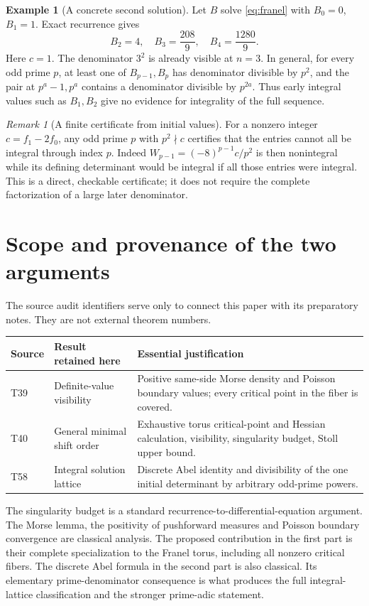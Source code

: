 \documentclass[11pt,a4paper]{article}
\theoremstyle{definition}\newtheorem{definition}[theorem]{Definition}
\newtheorem{example}[theorem]{Example}
\theoremstyle{remark}\newtheorem{remark}[theorem]{Remark}
\begin{document}
\begin{example}[A concrete second solution]
Let $B$ solve \eqref{eq:franel} with $B_0=0$, $B_1=1$. Exact recurrence gives
\[
 B_2=4,\quad B_3=\frac{208}{9},\quad B_4=\frac{1280}{9}.
\]
Here $c=1$. The denominator $3^2$ is already visible at $n=3$. In general,
for every odd prime $p$, at least one of $B_{p-1},B_p$ has denominator divisible
by $p^2$, and the pair at $p^a-1,p^a$ contains a denominator divisible by
$p^{2a}$. Thus early integral values such as $B_1,B_2$ give no evidence for
integrality of the full sequence.
\end{example}

\begin{remark}[A finite certificate from initial values]
For a nonzero integer $c=f_1-2f_0$, any odd prime $p$ with $p^2\nmid c$
certifies that the entries cannot all be integral through index $p$. Indeed
$W_{p-1}=(-8)^{p-1}c/p^2$ is then nonintegral while its defining determinant
would be integral if all those entries were integral. This is a direct,
checkable certificate; it does not require the complete factorization of a
large later denominator.
\end{remark}

\section{Scope and provenance of the two arguments}
The source audit identifiers serve only to connect this paper with its
preparatory notes. They are not external theorem numbers.
\begin{center}
\begin{tabular}{@{}p{}p{}p{}@{}}
\toprule
Source & Result retained here & Essential justification\\
\midrule
T39 & Definite-value visibility & Positive same-side Morse density and
Poisson boundary values; every critical point in the fiber is covered.\\
T40 & General minimal shift order & Exhaustive torus critical-point and
Hessian calculation, visibility, singularity budget, Stoll upper bound.\\
T58 & Integral solution lattice & Discrete Abel identity and divisibility
of the one initial determinant by arbitrary odd-prime powers.\\
\bottomrule
\end{tabular}
\end{center}

The singularity budget is a standard recurrence-to-differential-equation
argument. The Morse lemma, the positivity of pushforward measures and Poisson
boundary convergence are classical analysis. The proposed contribution in
the first part is their complete specialization to the Franel torus, including
all nonzero critical fibers. The discrete Abel formula in the second part is
also classical. Its elementary prime-denominator consequence is what produces
the full integral-lattice classification and the stronger prime-adic statement.
\end{document}
